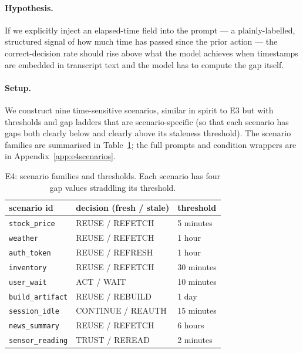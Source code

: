 \documentclass[11pt]{article}
\newcommand{\code}[1]{\texttt{\small #1}}
\begin{document}
\paragraph{Hypothesis.} If we explicitly inject an elapsed-time field into the prompt --- a
plainly-labelled, structured signal of how much time has passed since the prior action --- the
correct-decision rate should rise above what the model achieves when timestamps are embedded
in transcript text and the model has to compute the gap itself.

\paragraph{Setup.} We construct nine time-sensitive scenarios, similar in spirit to E3 but
with thresholds and gap ladders that are scenario-specific (so that each scenario has gaps
both clearly below and clearly above its staleness threshold). The scenario families are
summarised in Table~\ref{tab:e4scenarios}; the full prompts and condition wrappers are in
Appendix~\ref{app:e4scenarios}.

\begin{table}[h]
\centering
\caption{E4: scenario families and thresholds. Each scenario has four gap values straddling
its threshold.}
\label{tab:e4scenarios}
\begin{tabular}{@{}lll@{}}
\toprule
scenario id        & decision (fresh / stale)   & threshold \\
\midrule
\code{stock\_price}     & REUSE / REFETCH         & 5 minutes \\
\code{weather}          & REUSE / REFETCH         & 1 hour \\
\code{auth\_token}      & REUSE / REFRESH         & 1 hour \\
\code{inventory}        & REUSE / REFETCH         & 30 minutes \\
\code{user\_wait}       & ACT / WAIT              & 10 minutes \\
\code{build\_artifact}  & REUSE / REBUILD         & 1 day \\
\code{session\_idle}    & CONTINUE / REAUTH       & 15 minutes \\
\code{news\_summary}    & REUSE / REFETCH         & 6 hours \\
\code{sensor\_reading}  & TRUST / REREAD          & 2 minutes \\
\bottomrule
\end{tabular}
\end{table}
\end{document}
